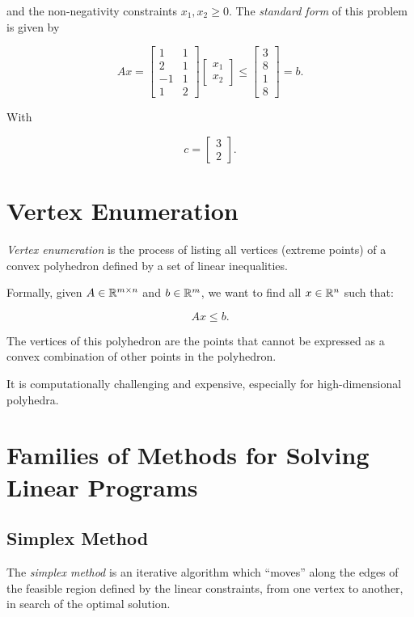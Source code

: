 and the non-negativity constraints \(x_1, x_2 \ge 0\). The \emph{standard form} of this problem is given by

\[
	Ax =
	\begin{bmatrix}
		1  & 1 \\
		2  & 1 \\
		-1 & 1 \\
		1  & 2
	\end{bmatrix}
	\begin{bmatrix}
		x_1 \\
		x_2
	\end{bmatrix}
	\leq
	\begin{bmatrix}
		3 \\
		8 \\
		1 \\
		8
	\end{bmatrix}
	= b.
\]

With

\[
	c =
	\begin{bmatrix}
		3 \\
		2
	\end{bmatrix}.
\]

\section{Vertex Enumeration}

\emph{Vertex enumeration} is the process of listing all vertices (extreme points) of a convex polyhedron defined by a set of linear
inequalities.

Formally, given \(A \in \mathbb{R}^{m \times n}\) and \(b \in \mathbb{R}^m\), we want to find all \(x \in \mathbb{R}^n\) such that:

\[
	Ax \le b.
\]

The vertices of this polyhedron are the points that cannot be expressed as a convex combination of
other points in the polyhedron.

It is computationally challenging and expensive, especially for high-dimensional polyhedra.

\section{Families of Methods for Solving Linear Programs}

\subsection{Simplex Method}

The \emph{simplex method} is an iterative algorithm which ``moves'' along the edges of the feasible region defined
by the linear constraints, from one vertex to another, in search of the optimal solution.

